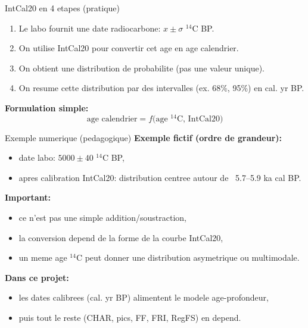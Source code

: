 \documentclass[aspectratio=169,11pt]{beamer}
\begin{document}
\begin{frame}{IntCal20 en 4 etapes (pratique)}
\begin{enumerate}
  \item Le labo fournit une date radiocarbone: \(x \pm \sigma\) \(^{14}\)C BP.
  \item On utilise IntCal20 pour convertir cet age en age calendrier.
  \item On obtient une distribution de probabilite (pas une valeur unique).
  \item On resume cette distribution par des intervalles (ex. 68\%, 95\%) en cal. yr BP.
\end{enumerate}

\vspace{0.2cm}
\textbf{Formulation simple:}
\[
\text{age calendrier} = f\big(\text{age }^{14}\text{C},\, \text{IntCal20}\big)
\]
\end{frame}

\begin{frame}{Exemple numerique (pedagogique)}
\textbf{Exemple fictif (ordre de grandeur):}
\begin{itemize}
  \item date labo: \(5000 \pm 40\) \(^{14}\)C BP,
  \item apres calibration IntCal20: distribution centree autour de ~5.7--5.9 ka cal BP.
\end{itemize}

\textbf{Important:}
\begin{itemize}
  \item ce n'est pas une simple addition/soustraction,
  \item la conversion depend de la forme de la courbe IntCal20,
  \item un meme age \(^{14}\)C peut donner une distribution asymetrique ou multimodale.
\end{itemize}

\textbf{Dans ce projet:}
\begin{itemize}
  \item les dates calibrees (cal. yr BP) alimentent le modele age-profondeur,
  \item puis tout le reste (CHAR, pics, FF, FRI, RegFS) en depend.
\end{itemize}
\end{frame}
\end{document}
